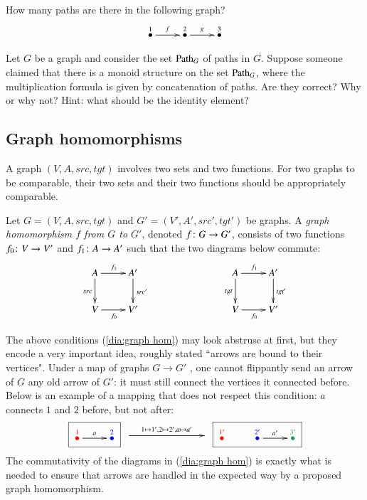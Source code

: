 \begin{exercise}
How many paths are there in the following graph? 
$$\xymatrix{\LMO{1}\ar[r]^{f}&\LMO{2}\ar[r]^{g}&\LMO{3}}$$
\end{exercise}

\begin{exercise}
Let $G$ be a graph and consider the set $\Path_G$ of paths in $G$. Suppose someone claimed that there is a monoid structure on the set $\Path_G$, where the multiplication formula is given by concatenation of paths. Are they correct? Why or why not? Hint: what should be the identity element?
\end{exercise}



\subsection{Graph homomorphisms}

A graph $(V,A,src,tgt)$ involves two sets and two functions. For two graphs to be comparable, their two sets and their two functions should be appropriately comparable.

\begin{definition}\label{def:graph homomorphism}

Let $G=(V,A,src,tgt)$ and $G'=(V',A',src',tgt')$ be graphs. A {\em graph homomorphism $f$ from $G$ to $G'$}, denoted $f\colon G\rightarrow G'$, consists of two functions $f_0\colon V\rightarrow V'$ and $f_1\colon A\rightarrow A'$ such that the two diagrams below commute:
\begin{align}\label{dia:graph hom}
\xymatrix{A\ar[r]^{f_1}\ar[d]_{src}&A'\ar[d]^{src'}\\V\ar[r]_{f_0}&V'
}\hspace{1in}
\xymatrix{A\ar[r]^{f_1}\ar[d]_{tgt}&A'\ar[d]^{tgt'}\\V\ar[r]_{f_0}&V'
}
\end{align}

\end{definition}

\begin{remark}

The above conditions (\ref{dia:graph hom}) may look abstruse at first, but they encode a very important idea, roughly stated ``arrows are bound to their vertices". Under a map of graphs $G\to G'$ , one cannot flippantly send an arrow of $G$ any old arrow of $G'$: it must still connect the vertices it connected before. Below is an example of a mapping that does not respect this condition: $a$ connects $1$ and $2$ before, but not after:
$$
\fbox{\xymatrix{\LMO{\color{red}{1}}\ar[r]^{a}&\LMO{\color{blue}{2}}}}
\xymatrix{~\ar[rr]^{1\mapsto 1',2\mapsto 2', a\mapsto a'}&\hsp&~}
\fbox{\xymatrix{\LMO{\color{red}{1'}}&\LMO{\color{blue}{2'}}\ar[r]^{a'}&\LMO{\color{ForestGreen}{3'}}}}
$$
The commutativity of the diagrams in (\ref{dia:graph hom}) is exactly what is needed to ensure that arrows are handled in the expected way by a proposed graph homomorphism.
 
\end{remark}

